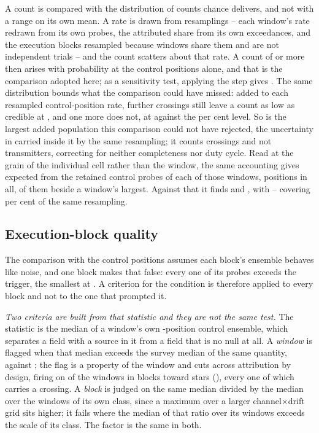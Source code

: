 A count is compared with the distribution of counts chance delivers, and
not with a range on its own mean. A rate is drawn from \CeNBoot{} resamplings
-- each window's rate redrawn from its own \NCtrl{} probes, the attributed
share from its own \CeNExc{} exceedances, and the execution blocks resampled
because windows share them and are not independent trials -- and the count
scatters about that rate. A count of \CeObs{} or more then arises with
probability \CeProbNull{} at the control positions alone, and that is the
comparison adopted here; as a sensitivity test, applying the step gives
\CeProbStep. The same distribution bounds what the comparison could have
missed: added to each resampled control-position rate, \CeAddLim{} further
crossings still leave a count as low as \CeObs{} credible at \CeProbAtLim,
and one more does not, at \CeProbAboveLim{} against the \CeAlphaPct{} per
cent level. So \CeAddLim{} is the largest added population this comparison
could not have rejected, the uncertainty in \CeExp{} carried inside it by the
same resampling; it counts crossings and not transmitters, correcting for
neither completeness nor duty cycle. Read at the grain of
the individual cell rather than the window, the same accounting gives
\CkExp{} expected from the \CkNCtrlPerWin{} retained control probes of each
of those \CkNWin{} windows, \CkNCtrlPos{} positions in all, \CkExpSec{}
of them beside a window's largest. Against that it finds \CkNObs{} and
\CkNSecUnattr, with \CkLo--\CkHi{} covering \CeCovPct{} per cent of the same
resampling.

\subsection{Execution-block quality}
\label{sec:blockquality}

The comparison with the control positions assumes each block's ensemble
behaves like noise, and one block makes that false: every one of its \NCtrl{}
probes exceeds the trigger, the smallest at \BqFailCtrlMin. A criterion for
the condition is therefore applied to every block and not to the one that
prompted it.

\emph{Two criteria are built from that statistic and they are not the same
test.} The statistic is the median of a window's own \NCtrl-position control
ensemble, which separates a field with a source in it from a field that is no
null at all. A \emph{window} is flagged when that median exceeds \BqFactor{}
the survey median of the same quantity, \DqThresh{} against \DqSurvMed; the
flag is a property of the window and cuts across attribution by design,
firing on \DqNWin{} of the \NWindows{} windows in \BkFlagNBlock{} blocks
toward \DqNStar{} stars (\DqStars), every one of which carries a crossing.
A \emph{block} is judged on the same median divided by the median over the
windows of its own class, since a maximum over a larger channel$\times$drift
grid sits higher; it fails where the median of that ratio over its windows
exceeds \BqFactor{} the scale of its class. The factor is the same in both.

